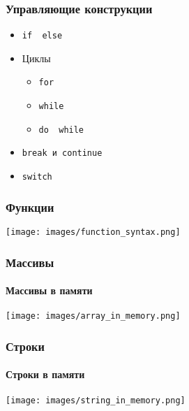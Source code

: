 \documentclass[12pt,pdf,hyperref={unicode}]{beamer}
\begin{document}
\begin{frame}[fragile]
\frametitle{Управляющие конструкции} 
\begin{itemize}
\item 
\begin{verbatim}
if  else
\end{verbatim}
\item Циклы
\begin{itemize}
\item 
\begin{verbatim}
for
\end{verbatim}
\item 
\begin{verbatim}
while
\end{verbatim}
\item 
\begin{verbatim}
do  while
\end{verbatim}
\end{itemize}
\item  
\begin{verbatim}
break и continue
\end{verbatim}
\item  
\begin{verbatim}
switch
\end{verbatim}
\end{itemize}
\end{frame}

\begin{frame}[fragile]
\frametitle{Функции} 
\begin{center}
\texttt{[image: images/function\_syntax.png]}
\end{center}
\end{frame}

\begin{frame}[fragile]
\frametitle{Массивы} 
\framesubtitle{Массивы в памяти}
\begin{center}
\texttt{[image: images/array\_in\_memory.png]}
\end{center}
\end{frame}

\begin{frame}[fragile]
\frametitle{Строки} 
\framesubtitle{Строки в памяти}
\begin{center}
\texttt{[image: images/string\_in\_memory.png]}
\end{center}
\end{frame}
\end{document}
